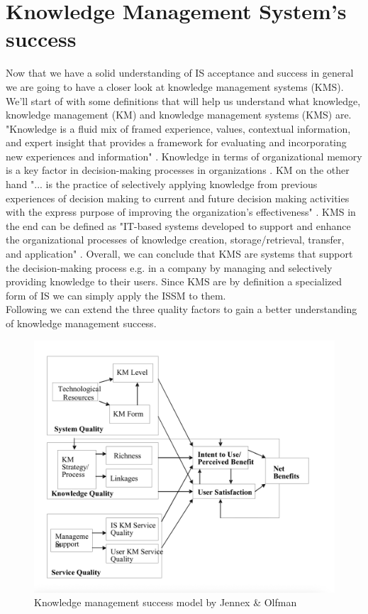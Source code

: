 \documentclass[
	english,
	ruledheaders=section,%
	class=report,%
	thesis={type=bachelor},%
	accentcolor=1b,%
	custommargins=true,%
	marginpar=false,%
	parskip=half-,%
	fontsize=11pt,%
	DIV=14,
]{tudapub}
\begin{document}
\section{Knowledge Management System's success}
Now that we have a solid understanding of IS acceptance and success in general we are going to have a closer look at knowledge management systems (KMS). We'll start of with some definitions that will help us understand what knowledge, knowledge management (KM) and knowledge management systems (KMS) are. "Knowledge is a fluid mix of framed experience, values, contextual information, and expert insight that provides a framework for
evaluating and incorporating new experiences and information" \parencite[p.~4]{Davenport1998}. Knowledge in terms of organizational memory is a key factor in decision-making processes in organizations \parencite[p.~52]{Jennex2006}. KM on the other hand "... is the practice of selectively applying knowledge from previous experiences of decision making to current and future decision making activities with the express purpose of improving the organization’s effectiveness" \parencite[p.~1]{Jennex2006WhatIsKM}. KMS in the end can be defined as "IT-based systems developed to support and
enhance the organizational processes of knowledge creation, storage/retrieval, transfer, and application" \parencite[p.~114]{Alavi2001}. Overall, we can conclude that KMS are systems that support the decision-making process e.g. in a company by managing and selectively providing knowledge to their users. Since KMS are by definition a specialized form of IS we can simply apply the ISSM to them.\\
Following \cite{Jennex2006} we can extend the three quality factors to gain a better understanding
of knowledge management success.\\
\begin{figure}
    \centering
    \includegraphics[width=0.6\linewidth]{images/knowledge_management_success.png}
    \caption{Knowledge management success model by Jennex \& Olfman \parencite[p.~56]{Jennex2006}}
    \label{fig:enter-label}
\end{figure}
\end{document}
